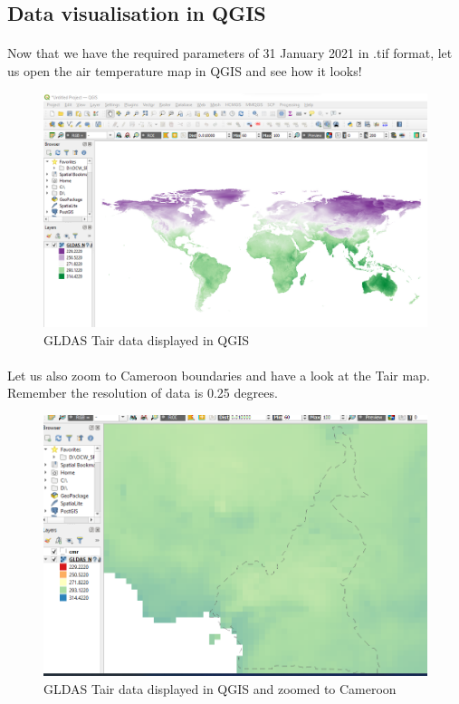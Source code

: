 \subsection{ Data visualisation in QGIS}
\paragraph{}
Now that we have the required parameters of 31 January 2021 in \scriptsize{.tif} \normalsize format, let us open the air temperature map in QGIS and see how it looks!
\begin{figure}[H]
\begin{center}
\includegraphics[scale=0.5]{qgis1.png} %
\end{center}
\caption{GLDAS Tair data displayed in QGIS}
\label{GLDAS Tair data displayed in QGIS}%
\end{figure}
\paragraph{}
Let us also zoom to Cameroon boundaries and have a look at the Tair map.
\newline
Remember the resolution of data is 0.25 degrees.
\begin{figure}[H]
\begin{center}
\includegraphics[scale=0.5]{qgis2.png} %
\end{center}
\caption{GLDAS Tair data displayed in QGIS and zoomed to Cameroon}
\label{GLDAS Tair data displayed in QGIS and zoomed to Cameroon}%
\end{figure}
